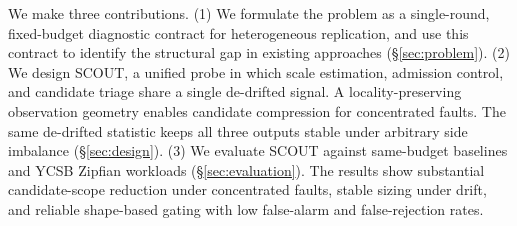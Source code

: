 We make three contributions. (1) We formulate the problem as a single-round, fixed-budget diagnostic contract for heterogeneous replication, and use this contract to identify the structural gap in existing approaches (\S\ref{sec:problem}). (2) We design SCOUT, a unified probe in which scale estimation, admission control, and candidate triage share a single de-drifted signal. A locality-preserving observation geometry enables candidate compression for concentrated faults. The same de-drifted statistic keeps all three outputs stable under arbitrary side imbalance (\S\ref{sec:design}). (3) We evaluate SCOUT against same-budget baselines and YCSB Zipfian workloads (\S\ref{sec:evaluation}). The results show substantial candidate-scope reduction under concentrated faults, stable sizing under drift, and reliable shape-based gating with low false-alarm and false-rejection rates.
